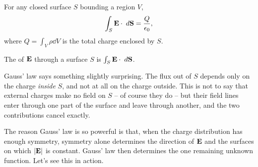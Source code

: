 \documentclass[a4paper]{scrartcl}
\begin{document}
\begin{law}
	For any closed surface $S$ bounding a region $V$,
	$$
	\int_S \mathbf{E} \cdot \; d \mathbf{S} = \frac{Q}{\epsilon_0},
	$$
	where $Q = \int_V \rho \dd V$ is the total charge enclosed by $S$.
\end{law}

\begin{definition}[Flux]
	The  of $\mathbf{E}$ through a surface $S$ is $\int_S \mathbf{E}\cdot \; d \mathbf{S}$.
\end{definition}

Gauss' law says something slightly surprising. The flux out of $S$ depends only on the charge \emph{inside} $S$, and not at all on the charge outside. This is not to say that external charges make no field on $S$ -- of course they do -- but their field lines enter through one part of the surface and leave through another, and the two contributions cancel exactly.

The reason Gauss' law is so powerful is that, when the charge distribution has enough symmetry, symmetry alone determines the direction of $\mathbf{E}$ and the surfaces on which $|\mathbf{E}|$ is constant. Gauss' law then determines the one remaining unknown function. Let's see this in action.
\end{document}
